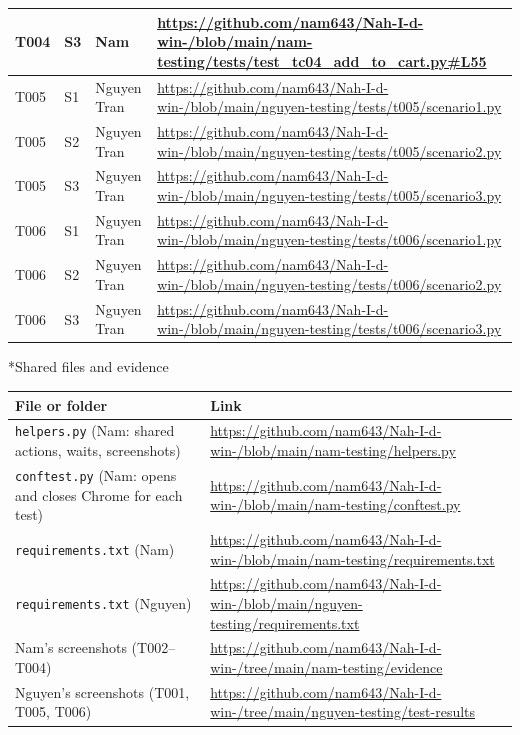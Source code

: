\documentclass[11pt,a4paper]{article}
\makeatletter
\renewcommand\subsection{\@startsection{subsection}{2}{0pt}{2ex plus .5ex}{.8ex}{\Large\bfseries}}
\makeatother
\begin{document}
{\begin{longtable}{|L{1.3cm}|L{1.4cm}|L{2.1cm}|L{10.6cm}|}
T004 & S3 & Nam & \url{https://github.com/nam643/Nah-I-d-win-/blob/main/nam-testing/tests/test_tc04_add_to_cart.py#L55} \\ \hline
T005 & S1 & Nguyen Tran & \url{https://github.com/nam643/Nah-I-d-win-/blob/main/nguyen-testing/tests/t005/scenario1.py} \\ \hline
T005 & S2 & Nguyen Tran & \url{https://github.com/nam643/Nah-I-d-win-/blob/main/nguyen-testing/tests/t005/scenario2.py} \\ \hline
T005 & S3 & Nguyen Tran & \url{https://github.com/nam643/Nah-I-d-win-/blob/main/nguyen-testing/tests/t005/scenario3.py} \\ \hline
T006 & S1 & Nguyen Tran & \url{https://github.com/nam643/Nah-I-d-win-/blob/main/nguyen-testing/tests/t006/scenario1.py} \\ \hline
T006 & S2 & Nguyen Tran & \url{https://github.com/nam643/Nah-I-d-win-/blob/main/nguyen-testing/tests/t006/scenario2.py} \\ \hline
T006 & S3 & Nguyen Tran & \url{https://github.com/nam643/Nah-I-d-win-/blob/main/nguyen-testing/tests/t006/scenario3.py} \\ \hline
\end{longtable}}

\subsection*{Shared files and evidence}
{\renewcommand{\arraystretch}{1.3}
\begin{longtable}{|L{4.0cm}|>{\footnotesize\raggedright\arraybackslash}p{12.2cm}|}
\hline
{}\textbf{File or folder} & \normalsize\textbf{Link} \\ \hline
\endhead
\texttt{helpers.py} (Nam: shared actions, waits, screenshots) & \url{https://github.com/nam643/Nah-I-d-win-/blob/main/nam-testing/helpers.py} \\ \hline
\texttt{conftest.py} (Nam: opens and closes Chrome for each test) & \url{https://github.com/nam643/Nah-I-d-win-/blob/main/nam-testing/conftest.py} \\ \hline
\texttt{requirements.txt} (Nam) & \url{https://github.com/nam643/Nah-I-d-win-/blob/main/nam-testing/requirements.txt} \\ \hline
\texttt{requirements.txt} (Nguyen) & \url{https://github.com/nam643/Nah-I-d-win-/blob/main/nguyen-testing/requirements.txt} \\ \hline
Nam's screenshots (T002--T004) & \url{https://github.com/nam643/Nah-I-d-win-/tree/main/nam-testing/evidence} \\ \hline
Nguyen's screenshots (T001, T005, T006) & \url{https://github.com/nam643/Nah-I-d-win-/tree/main/nguyen-testing/test-results} \\ \hline
\end{longtable}}
\end{document}
